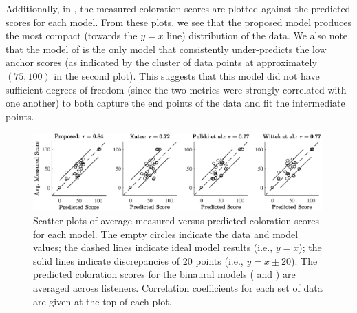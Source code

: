 Additionally, in , the measured coloration scores are plotted against the predicted scores for each model.
From these plots, we see that the proposed model produces the most compact (towards the $y = x$ line) distribution of the data.
We also note that the model of \citet{Kates1984} is the only model that consistently under-predicts the low anchor scores (as indicated by the cluster of data points at approximately $(75,100)$ in the second plot).
This suggests that this model did not have sufficient degrees of freedom (since the two metrics were strongly correlated with one another) to both capture the end points of the data and fit the intermediate points.

\begin{figure}[t]
\centering
  \includegraphics[width=0.99\textwidth,trim={2.15cm 0.3cm 2.3cm 0.5cm},clip]{05_proposed_models/figures/ColorationModelComparison}
  \caption[Scatter plots of average measured versus predicted coloration scores.]{
  Scatter plots of average measured versus predicted coloration scores for each model.
  The empty circles indicate the data and model values;
  the dashed lines indicate ideal model results (i.e., $y = x$);
  the solid lines indicate discrepancies of 20 points (i.e., $y = x \pm 20$).
  The predicted coloration scores for the binaural models (\citet{Pulkki1999} and \citet{Wittek2007}) are averaged across listeners.
  Correlation coefficients for each set of data are given at the top of each plot.}
  \label{fig:Coloration_Model_Comparison}
\end{figure}
